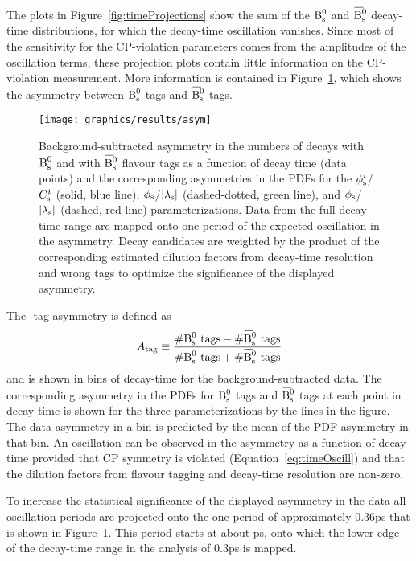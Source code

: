 The plots in Figure~\ref{fig:timeProjections} show the sum of the $\text{B}_\text{s}^\text{0}$ and $\Bsbar$ decay-time distributions, for which the decay-time
oscillation vanishes. Since most of the sensitivity for the CP-violation parameters comes from the amplitudes of the oscillation terms,
these projection plots contain little information on the CP-violation measurement. More information is contained in
Figure~\ref{fig:BBbarAsymmetry}, which shows the asymmetry between $\text{B}_\text{s}^\text{0}$ tags and $\Bsbar$ tags.
\begin{figure}[htb]
  \centering
  \texttt{[image: graphics/results/asym]}
  \caption{Background-subtracted asymmetry in the numbers of decays with $\text{B}_\text{s}^\text{0}$ and with $\Bsbar$ flavour tags as a function of decay time
           (data points) and the corresponding asymmetries in the PDFs for the $\phi_\text{s}^{i}$/$C_\text{s}^{i}$ (solid, blue line),
           $\phi_\text{s}$/$|{\lambda_{\text{s}}}|$ (dashed-dotted, green line), and $\phi_\text{s}$/$|{\lambda_{\text{s}}}|$ (dashed, red line) parameterizations.
           Data from the full decay-time range are mapped onto one period of the expected oscillation in the asymmetry.
           Decay candidates are weighted by the product of the corresponding estimated dilution factors from decay-time resolution
           and wrong tags to optimize the significance of the displayed asymmetry.}
  \label{fig:BBbarAsymmetry}
\end{figure}

The \BsBsbar-tag asymmetry is defined as
\[
  A_{\text{tag}} \equiv \frac{\#\Bs{}\text{ tags} - \#\Bsbar{}\text{ tags}}{\#\Bs{}\text{ tags} + \#\Bsbar{}\text{ tags}}
\]
and is shown in bins of decay-time for the background-subtracted data. The corresponding asymmetry in the PDFs for $\text{B}_\text{s}^\text{0}$ tags and $\Bsbar$
tags at each point in decay time is shown for the three parameterizations by the lines in the figure. The data asymmetry in a bin is
predicted by the mean of the PDF asymmetry in that bin. An oscillation can be observed in the asymmetry as a function of decay time
provided that CP symmetry is violated (Equation~\ref{eq:timeOscill}) and that the dilution factors from flavour tagging and decay-time
resolution are non-zero.

To increase the statistical significance of the displayed asymmetry in the data all oscillation periods are projected onto the one period
of approximately 0.36\unitsp{}ps that is shown in Figure~\ref{fig:BBbarAsymmetry}. This period starts at about \unitsp{}ps, onto
which the lower edge of the decay-time range in the analysis of 0.3\unitsp{}ps is mapped.

